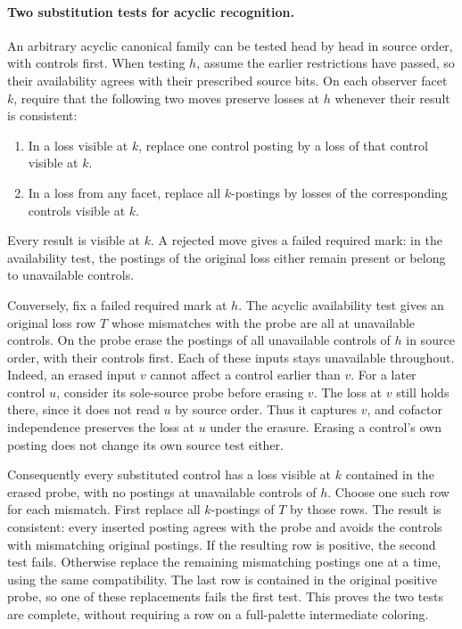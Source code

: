 \paragraph{Two substitution tests for acyclic recognition.}
An arbitrary acyclic canonical family can be tested
head by head in source order, with controls first.
When testing $h$, assume the earlier restrictions
have passed, so their availability agrees with
their prescribed source bits. On each observer
facet $k$, require that the following two moves
preserve losses at $h$ whenever their result is
consistent:
\begin{enumerate}
\item In a loss visible at $k$, replace one control
posting by a loss of that control visible at $k$.
\item In a loss from any facet, replace all
$k$-postings by losses of the corresponding
controls visible at $k$.
\end{enumerate}
Every result is visible at $k$. A rejected move
gives a failed required mark: in the availability
test, the postings of the original loss either
remain present or belong to unavailable controls.

Conversely, fix a failed required mark at $h$.
The acyclic availability test gives an original
loss row $T$ whose mismatches with the probe are
all at unavailable controls. On the probe erase
the postings of all unavailable controls of $h$
in source order, with their controls first.
Each of these inputs stays unavailable throughout.
Indeed, an erased input $v$ cannot affect a
control earlier than $v$. For a later control
$u$, consider its sole-source probe before
erasing $v$. The loss at $v$ still holds there,
since it does not read $u$ by source order.
Thus it captures $v$, and cofactor independence
preserves the loss at $u$ under the erasure.
Erasing a control's own posting does not change
its own source test either.

Consequently every substituted control has a
loss visible at $k$ contained in the erased
probe, with no postings at unavailable controls
of $h$. Choose one such row for each mismatch.
First replace all $k$-postings of $T$ by those
rows. The result is consistent: every inserted
posting agrees with the probe and avoids the
controls with mismatching original postings.
If the resulting row is positive, the second
test fails. Otherwise replace the remaining
mismatching postings one at a time, using the
same compatibility. The last row is contained
in the original positive probe, so one of
these replacements fails the first test.
This proves the two tests are complete,
without requiring a row on a full-palette
intermediate coloring.

